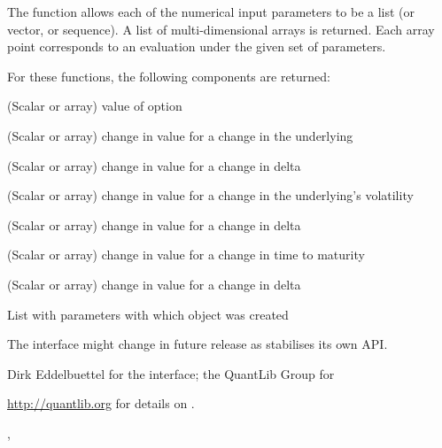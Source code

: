 \begin{Value}
The  function allows each of the numerical
input parameters to be a list (or vector, or sequence). A list of
multi-dimensional arrays is returned. Each array point corresponds to
an evaluation under the given set of parameters. 

For these functions, the following components are returned:
\begin{ldescription}
\item[\code{value}] (Scalar or array) value of option
\item[\code{delta}] (Scalar or array) change in value for a change in the underlying
\item[\code{gamma}] (Scalar or array) change in value for a change in delta
\item[\code{vega}] (Scalar or array) change in value for a change in the underlying's volatility
\item[\code{theta}] (Scalar or array) change in value for a change in delta
\item[\code{rho}] (Scalar or array) change in value for a change in time to maturity
\item[\code{dividendRho}] (Scalar or array) change in value for a change in delta
\item[\code{parameters}] List with parameters with which object was created
\end{ldescription}
\end{Value}
\begin{Note}\relax
The interface might change in future release as 
stabilises its own API.
\end{Note}
\begin{Author}\relax
Dirk Eddelbuettel  for the \R{} interface;
the QuantLib Group for 
\end{Author}
\begin{References}\relax
\url{http://quantlib.org} for details on .
\end{References}
\begin{SeeAlso}\relax
{},
\end{SeeAlso}
